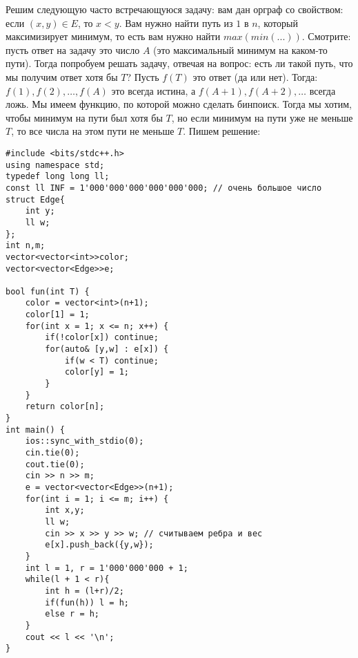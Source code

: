 \documentclass{article}
\begin{document}
Решим следующую часто встречающуюся задачу: вам дан орграф со свойством: если $(x,y) \in E$, то $x < y$. Вам нужно найти путь из $1$ в $n$, который максимизирует минимум, то есть вам нужно найти $max(min(...))$. Смотрите: пусть ответ на задачу это число $A$ (это максимальный минимум на каком-то пути). Тогда попробуем решать задачу, отвечая на вопрос: есть ли такой путь, что мы получим ответ хотя бы $T$? Пусть $f(T)$ это ответ (да или нет). Тогда: $f(1), f(2), \ldots, f(A)$ это всегда истина, а $f(A+1),f(A+2),\ldots$ всегда ложь. Мы имеем функцию, по которой можно сделать бинпоиск. Тогда мы хотим, чтобы минимум на пути был хотя бы $T$, но если минимум на пути уже не меньше $T$, то все числа на этом пути не меньше $T$. Пишем решение:

\begin{verbatim}
#include <bits/stdc++.h>
using namespace std;
typedef long long ll;
const ll INF = 1'000'000'000'000'000'000; // очень большое число 
struct Edge{
    int y;
    ll w;
};
int n,m;
vector<vector<int>>color;
vector<vector<Edge>>e;

bool fun(int T) {
    color = vector<int>(n+1);
    color[1] = 1;
    for(int x = 1; x <= n; x++) {
        if(!color[x]) continue;
        for(auto& [y,w] : e[x]) {
            if(w < T) continue;
            color[y] = 1;
        }
    }
    return color[n];
}
int main() {
    ios::sync_with_stdio(0);
    cin.tie(0);
    cout.tie(0);
    cin >> n >> m;
    e = vector<vector<Edge>>(n+1);
    for(int i = 1; i <= m; i++) {
        int x,y;
        ll w;
        cin >> x >> y >> w; // считываем ребра и вес
        e[x].push_back({y,w});
    }
    int l = 1, r = 1'000'000'000 + 1;
    while(l + 1 < r){
        int h = (l+r)/2;
        if(fun(h)) l = h;
        else r = h;
    }
    cout << l << '\n';
}
\end{verbatim}

    
\end{document}
